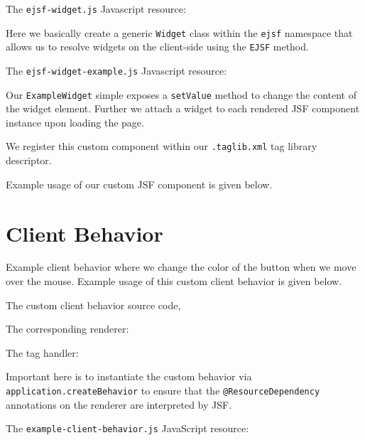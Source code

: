 The \texttt{ejsf-widget.js} Javascript resource:

Here we basically create a generic \texttt{Widget} class within the \texttt{ejsf} namespace that allows us to resolve widgets on the client-side using the \texttt{EJSF} method.

The \texttt{ejsf-widget-example.js} Javascript resource:

Our \texttt{ExampleWidget} simple exposes a \texttt{setValue} method to change the content of the widget element.
Further we attach a widget to each rendered JSF component instance upon loading the page.

We register this custom component within our \texttt{.taglib.xml} tag library descriptor.


Example usage of our custom JSF component is given below.


\section{Client Behavior}
Example client behavior where we change the color of the button when we move over the mouse.
Example usage of this custom client behavior is given below.


The custom client behavior source code,


The corresponding renderer:


The tag handler:

Important here is to instantiate the custom behavior via \texttt{application.createBehavior} to ensure that the \texttt{@ResourceDependency} annotations on the renderer are interpreted by JSF.

The \texttt{example-client-behavior.js} JavaScript resource:


